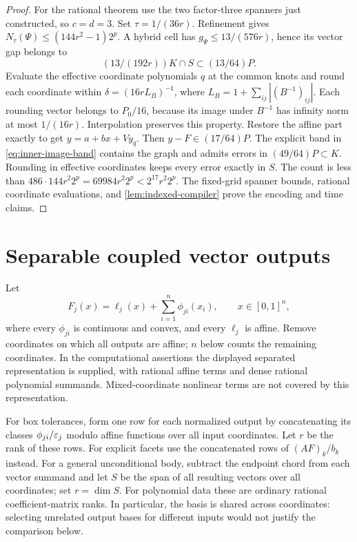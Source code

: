 \begin{proof}
For the rational theorem use the two factor-three spanners just
constructed, so $c=d=3$. Set $\tau=1/(36r)$. Refinement gives
$N_\tau(\Psi)\le(144r^2-1)2^p$. A hybrid cell has
$g_\Psi\le13/(576r)$, hence its vector gap belongs to
\[
 (13/(192r))K\cap S\subset(13/64)P.
\]
Evaluate the effective coordinate polynomials $q$ at the common knots
and round each coordinate within
$\delta=(16rL_B)^{-1}$, where
$L_B=1+\sum_{ij}|(B^{-1})_{ij}|$.
Each rounding vector belongs to $P_0/16$, because its image under
$B^{-1}$ has infinity norm at most $1/(16r)$. Interpolation preserves
this property. Restore the affine part exactly to get
$y=a+bx+Vy_q$. Then $y-F\in(17/64)P$.
The explicit band in \eqref{eq:inner-image-band} contains the graph
and admits errors in $(49/64)P\subset K$.
Rounding in effective coordinates keeps every error exactly in $S$.
The count is less than
$486\cdot144r^2 2^p=69984r^2 2^p<2^{17}r^2 2^p$.
The fixed-grid spanner bounds, rational coordinate evaluations, and
\cref{lem:indexed-compiler} prove the encoding and time claims.
\end{proof}

\section{Separable coupled vector outputs}\label{sec:separable-vector}

Let
\begin{equation}\label{eq:separable-vector-model}
 F_j(x)=\ell_j(x)+\sum_{i=1}^n\phi_{ji}(x_i),
 \qquad x\in[0,1]^n,
\end{equation}
where every $\phi_{ji}$ is continuous and convex, and every $\ell_j$
is affine. Remove coordinates on which all outputs are affine; $n$
below counts the remaining coordinates. In the computational assertions
the displayed separated representation is supplied, with rational affine
terms and dense rational polynomial summands. Mixed-coordinate nonlinear
terms are not covered by this representation.

For box tolerances, form one row for each normalized output by concatenating
its classes $\phi_{ji}/\varepsilon_j$ modulo affine functions over all input
coordinates. Let $r$ be the rank of these rows. For explicit facets use
the concatenated rows of $(AF)_k/b_k$ instead. For a general unconditional
body, subtract the endpoint chord from each vector summand and let $S$
be the span of all resulting vectors over all coordinates; set $r=\dim S$.
For polynomial data these are ordinary rational coefficient-matrix ranks.
In particular, the basis is shared across coordinates: selecting unrelated
output bases for different inputs would not justify the comparison below.

